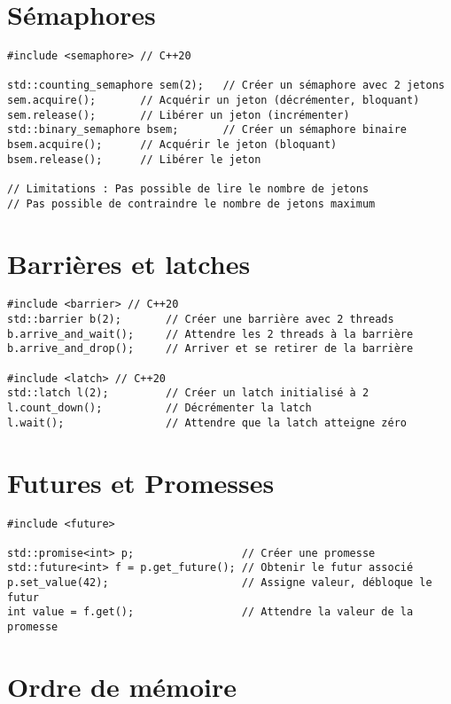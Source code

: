 \documentclass{article}
\begin{document}
\begin{multicols*}{3}
\section*{Sémaphores}

\begin{lstlisting}
#include <semaphore> // C++20

std::counting_semaphore sem(2);   // Créer un sémaphore avec 2 jetons
sem.acquire();       // Acquérir un jeton (décrémenter, bloquant)
sem.release();       // Libérer un jeton (incrémenter)
std::binary_semaphore bsem;       // Créer un sémaphore binaire
bsem.acquire();      // Acquérir le jeton (bloquant)
bsem.release();      // Libérer le jeton

// Limitations : Pas possible de lire le nombre de jetons
// Pas possible de contraindre le nombre de jetons maximum
\end{lstlisting}

\section*{Barrières et latches}
\begin{lstlisting}
#include <barrier> // C++20
std::barrier b(2);       // Créer une barrière avec 2 threads
b.arrive_and_wait();     // Attendre les 2 threads à la barrière
b.arrive_and_drop();     // Arriver et se retirer de la barrière

#include <latch> // C++20
std::latch l(2);         // Créer un latch initialisé à 2
l.count_down();          // Décrémenter la latch
l.wait();                // Attendre que la latch atteigne zéro
\end{lstlisting}

\section*{Futures et Promesses}

\begin{lstlisting}
#include <future>

std::promise<int> p;                 // Créer une promesse
std::future<int> f = p.get_future(); // Obtenir le futur associé
p.set_value(42);                     // Assigne valeur, débloque le futur
int value = f.get();                 // Attendre la valeur de la promesse
\end{lstlisting}

\section*{Ordre de mémoire}


\end{multicols*}
\end{document}
